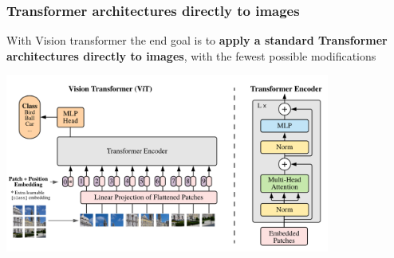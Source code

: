 \begin{frame}
\frametitle{Transformer architectures directly to images}
With Vision transformer the end goal is to \textbf{apply a standard Transformer architectures directly to images}, with the fewest possible modifications
\begin{center}
    \includegraphics[width=0.8\textwidth]{img/1-section/Vision transformer.png} 
\end{center}

\end{frame}